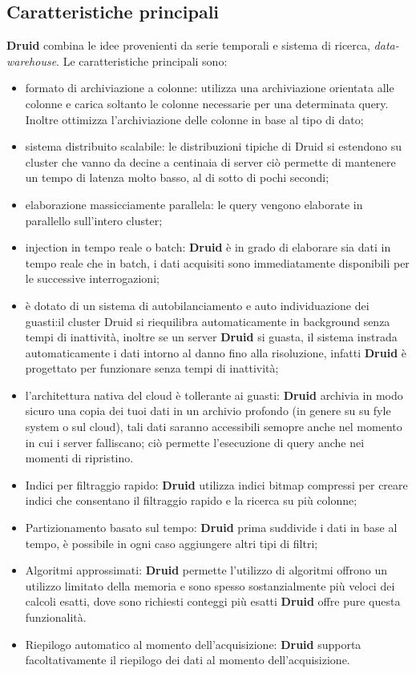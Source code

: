 \documentclass{article}
\begin{document}
\subsection{Caratteristiche principali}
\textbf{Druid} combina le idee provenienti da serie temporali e sistema di ricerca, \textit{data-warehouse}.
Le caratteristiche principali sono:
\begin{itemize}
    \item formato di archiviazione a colonne: utilizza una archiviazione orientata alle colonne e carica soltanto le colonne necessarie per una determinata query. Inoltre ottimizza l'archiviazione delle colonne in base al tipo di dato;
    \item sistema distribuito scalabile: le distribuzioni tipiche di Druid si estendono su cluster che vanno da decine a centinaia di server ciò permette di mantenere un tempo di latenza molto basso, al di sotto di pochi secondi;
    \item elaborazione massicciamente parallela: le query vengono elaborate in parallello sull'intero cluster;
    \item injection in tempo reale o batch: \textbf{Druid} è in grado di elaborare sia dati in tempo reale che in batch, i dati acquisiti sono immediatamente disponibili per le successive interrogazioni;
    \item è dotato di un sistema di autobilanciamento e auto individuazione dei guasti:il cluster Druid si riequilibra automaticamente in background senza tempi di inattività, inoltre se un server \textbf{Druid} si guasta, il sistema instrada automaticamente i dati intorno al danno fino alla risoluzione, infatti \textbf{Druid} è progettato per funzionare senza tempi di inattività;
    \item l'architettura nativa del cloud è tollerante ai guasti: \textbf{Druid} archivia in modo sicuro una copia dei tuoi dati in un archivio profondo (in genere su su fyle system o sul cloud), tali dati saranno accessibili semopre anche nel momento in cui i server falliscano; ciò permette l'esecuzione di query anche nei momenti di ripristino.
    \item Indici per filtraggio rapido: \textbf{Druid} utilizza indici bitmap compressi per creare indici che consentano il filtraggio rapido e la ricerca su più colonne;
    \item Partizionamento basato sul tempo: \textbf{Druid} prima suddivide i dati in base al tempo, è possibile in ogni caso aggiungere altri tipi di filtri;
   \item  Algoritmi approssimati:
   \textbf{Druid} permette l'utilizzo di algoritmi offrono un utilizzo limitato della memoria e sono spesso sostanzialmente più veloci dei calcoli esatti, dove sono richiesti conteggi più esatti \textbf{Druid} offre pure questa funzionalità.
   \item Riepilogo automatico al momento dell'acquisizione: \textbf{Druid} supporta facoltativamente il riepilogo dei dati al momento dell'acquisizione.
\end{itemize}
\end{document}
